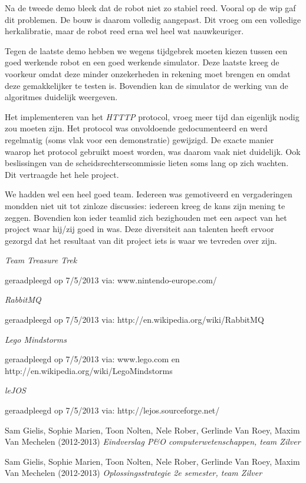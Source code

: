 \documentclass[eind]{penoverslag}
\begin{document}
Na de tweede demo bleek dat de robot niet zo stabiel reed. Vooral op de wip gaf dit problemen. De bouw is daarom volledig aangepast. Dit vroeg om een volledige herkalibratie, maar de robot reed erna wel heel wat nauwkeuriger.

Tegen de laatste demo hebben we wegens tijdgebrek moeten kiezen tussen een goed werkende robot en een goed werkende simulator. Deze laatste kreeg de voorkeur omdat deze minder onzekerheden in rekening moet brengen en omdat deze gemakkelijker te testen is. Bovendien kan de simulator de werking van de algoritmes duidelijk weergeven.

Het implementeren van het \textit{HTTTP} protocol, vroeg meer tijd dan eigenlijk nodig zou moeten zijn. Het protocol was onvoldoende gedocumenteerd en werd regelmatig (soms vlak voor een demonstratie) gewijzigd. De exacte manier waarop het protocol gebruikt moest worden, was daarom vaak niet duidelijk. Ook beslissingen van de scheidsrechterscommissie lieten soms lang op zich wachten. Dit vertraagde het hele project.

We hadden wel een heel goed team. Iedereen was gemotiveerd en vergaderingen mondden niet uit tot zinloze discussies: iedereen kreeg de kans zijn mening te zeggen. Bovendien kon ieder teamlid zich bezighouden met een aspect van het project waar hij/zij goed in was. Deze diversiteit aan talenten heeft ervoor gezorgd dat het resultaat van dit project iets is waar we tevreden over zijn.

\begin{flushleft}
\begin{thebibliography}{9}

\textit{Team Treasure Trek}
\begin{scriptsize}
geraadpleegd op 7/5/2013 via: \mbox{www.nintendo-europe.com/}
\end{scriptsize}

\textit{RabbitMQ}
\begin{scriptsize}
geraadpleegd op 7/5/2013 via: \mbox{http://en.wikipedia.org/wiki/RabbitMQ}
\end{scriptsize}

\textit{Lego Mindstorms}
\begin{scriptsize}
geraadpleegd op 7/5/2013 via: \mbox{www.lego.com} en \mbox{http://en.wikipedia.org/wiki/Lego\textendash Mindstorms}
\end{scriptsize}

\textit{leJOS}
\begin{scriptsize}
geraadpleegd op 7/5/2013 via: \mbox{http://lejos.sourceforge.net/}
\end{scriptsize}

Sam Gielis, Sophie Marien, Toon Nolten, Nele Rober, Gerlinde Van Roey, Maxim Van Mechelen (2012-2013) \textit{Eindverslag P\&O computerwetenschappen, team Zilver}

Sam Gielis, Sophie Marien, Toon Nolten, Nele Rober, Gerlinde Van Roey, Maxim Van Mechelen (2012-2013) \textit{Oplossingsstrategie 2e semester, team Zilver}

\end{thebibliography}
\end{flushleft}
\end{document}
